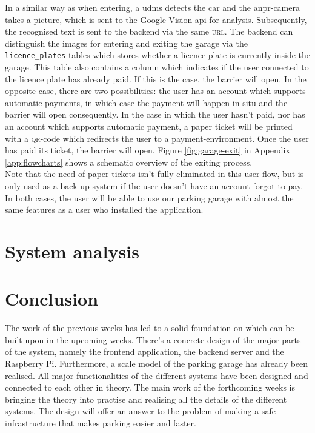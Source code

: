 \ind In a similar way as when entering, a \ac{udms} detects the car and the \ac{anpr}-camera takes a picture, which is sent to the Google Vision \ac{api} for analysis. Subsequently, the recognised text is sent to the backend via the same \textsc{url}. The backend can distinguish the images for entering and exiting the garage via the \verb|licence_plates|-tables which stores whether a licence plate is currently inside the garage. This table also contains a column which indicates if the user connected to the licence plate has already paid. If this is the case, the barrier will open. In the opposite case, there are two possibilities: the user has an account which supports automatic payments, in which case the payment will happen in situ and the barrier will open consequently. In the case in which the user hasn't paid, nor has an account which supports automatic payment, a paper ticket will be printed with a \textsc{qr}-code which redirects the user to a payment-environment. Once the user has paid its ticket, the barrier will open. Figure \ref{fig:garage-exit} in Appendix \ref{app:flowcharts} shows a schematic overview of the exiting process. \\


Note that the need of paper tickets isn't fully eliminated in this user flow, but is only used as a back-up system if the user doesn't have an account forgot to pay. In both cases, the user will be able to use our parking garage with almost the same features as a user who installed the application.

\section{System analysis}\label{sec:system analysis}

\section{Conclusion}\label{sec:coclusion}
The work of the previous weeks has led to a solid foundation on which can be built upon in the upcoming weeks. There's a concrete design of the major parts of the system, namely the frontend application, the backend server and the Raspberry Pi. Furthermore, a scale model of the parking garage has already been realised. All major functionalities of the different systems have been designed and connected to each other in theory. The main work of the forthcoming weeks is bringing the theory into practise and realising all the details of the different systems. The design will offer an answer to the problem of making a safe infrastructure that makes parking easier and faster.

